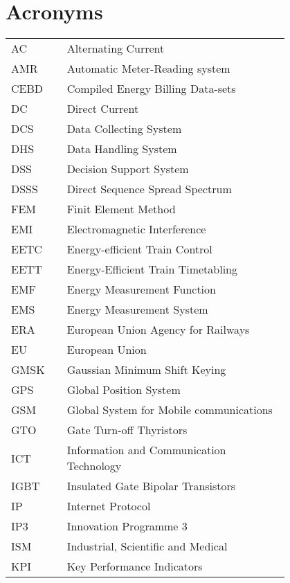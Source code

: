 \chapter*{Acronyms}

{
	\footnotesize
\begin{flushleft}
	\begin{tabular}{l p{0.8\linewidth}}
		
		\\
		
		AC	&	Alternating Current	\\
		AMR	&	Automatic Meter-Reading system	\\
		CEBD	&	Compiled Energy Billing Data-sets	\\
		DC	&	Direct Current	\\
		DCS	&	Data Collecting System	\\
		DHS	&	Data Handling System	\\
		DSS	&	Decision Support System	\\
		DSSS	&	Direct Sequence Spread Spectrum	\\
		FEM	&	Finit Element Method	\\
		EMI	&	Electromagnetic Interference	\\
		EETC	&	Energy-efficient Train Control	\\
		EETT	&	Energy-Efficient Train Timetabling	\\
		EMF	&	Energy Measurement Function	\\
		EMS	&	Energy Measurement System	\\
		ERA	&	European Union Agency for Railways	\\
		EU	&	European Union	\\
		GMSK	&	Gaussian Minimum Shift Keying	\\
		GPS	&	Global Position System	\\
		GSM	&	Global System for Mobile communications	\\
		GTO	&	Gate Turn-off Thyristors	\\
		ICT	&	Information and Communication Technology	\\
		IGBT	&	Insulated Gate Bipolar Transistors	\\
		IP	&	Internet Protocol	\\
		IP3	&	Innovation Programme 3	\\
		ISM	&	Industrial, Scientific and Medical	\\
		KPI	&	Key Performance Indicators	\\

\end{tabular}
\end{flushleft}}
